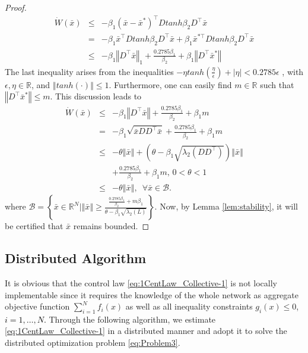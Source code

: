 \documentclass[letterpaper, 10 pt, conference]{ieeeconf}  %
\newcommand{\crb}{\color{black}}
\begin{document}
{\begin{proof}
	\begin{eqnarray*}
	\dot{W}(\bar{x}) & \leq & -\beta_{1}(\bar{x}-\bar{x}^{*})^{\top}Dtanh\beta_{2}D^{\top}\bar{x}\label{eq:1BoundedLemma}\\
	& = & -\beta_{1}\bar{x}^{\top}Dtanh\beta_{2}D^{\top}\bar{x}+\beta_{1}\bar{x}^{*\top}Dtanh\beta_{2}D^{\top}\bar{x}\\
	& \leq & -\beta_{1}\left\Vert D^{\top}\bar{x}\right\Vert _{1}+\frac{0.2785\beta_{1}}{\beta_{2}}+\beta_{1}\left\Vert D^{\top}\bar{x}^{*}\right\Vert
	\end{eqnarray*}
	The last {\crb inequality} arises from the inequalities $-\eta tanh(\frac{\eta}{\epsilon})+\left|\eta\right|<0.2785\epsilon$
	\cite{polycarpou1993robust}, with $\epsilon,\eta\in\mathbb{{R}}$,
	and $\left\Vert tanh(\cdot)\right\Vert \leq1$. Furthermore, one can
	easily find $m\in\mathbb{R}$ such that $\left\Vert D^{\top}\bar{x}^{*}\right\Vert \leq m$. This discussion leads to
	\begin{eqnarray*}
	\dot{W}(\bar{x}) & \leq & -\beta_{1}\left\Vert D^{\top}\bar{x}\right\Vert +\frac{0.2785\beta_{1}}{\beta_{2}}+\beta_{1}m\label{eq:boundedEnd}\\
	& = & -\beta_{1}\sqrt{\bar{x}DD^{\top}\bar{x}}+\frac{0.2785\beta_{1}}{\beta_{2}}+\beta_{1}m\\
	& \leq & -\theta\left\Vert \bar{x}\right\Vert +\left(\theta-\beta_{1}\sqrt{\lambda_{2}(DD^{\top})}\right)\left\Vert \bar{x}\right\Vert \\
	&  & +\frac{0.2785\beta_{1}}{\beta_{2}}+\beta_{1}m,\,0<\theta<1\\
	& \leq & -\theta\left\Vert \bar{x}\right\Vert ,\,\,\,\forall\bar{x}\in\mathcal{{B}}.
	\end{eqnarray*}
	where $\mathcal{{B}}=\left\{ \bar{x}\in\mathbb{{R}}^{N}|\left\Vert \bar{x}\right\Vert \geq\frac{\frac{0.2785\beta_{1}}{\beta_{2}}+m\beta_{1}}{\theta-\beta_{1}\sqrt{\lambda_{2}(L)}}\right\} $.
	Now, by Lemma \ref{lem:stability}, it will be certified that $\bar{x}$
	remains bounded.
\end{proof}




\subsection{Distributed Algorithm}

It is obvious that the control law \eqref{eq:1CentLaw_Collective-1}
is not locally implementable since it requires the knowledge of the
whole network as aggregate objective function $\sum_{i=1}^{N}f_{i}(x)$
as well as all inequality constraints $g_{i}(x)\leq0$,\textcolor{black}{{}
	$i=1,\ldots,N$.}  Through the following algorithm, we estimate
\eqref{eq:1CentLaw_Collective-1} in a distributed manner and adopt
it to solve the distributed optimization problem \eqref{eq:Problem3}.

}
\end{document}
